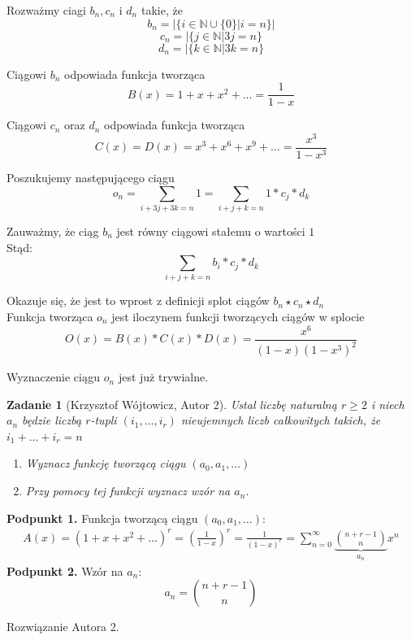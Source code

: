 \documentclass{mwart}
\newtheorem{zad}{Zadanie}[section]
\begin{document}
\begin{mdframed}
    Rozważmy ciagi $b_n,c_n$ i $d_n$ takie, że\\
    $$b_n = |\{i \in \mathbb{N} \cup \{0\}  | i = n\}|$$
    $$c_n = |\{j \in \mathbb{N} | 3j = n\}$$
    $$d_n = |\{k \in \mathbb{N} | 3k = n\}$$

    Ciągowi $b_n$ odpowiada funkcja tworząca\\
    $$ B(x) = 1 + x +x^2 + ... = \frac{1}{1-x}$$

    Ciągowi $c_n$ oraz $d_n$ odpowiada funkcja tworząca\\
    $$ C(x) = D(x) = x^3 + x^6 + x^9 + ... = \frac{x^3}{1-x^3}$$

    Poszukujemy następującego ciągu
    $$o_n = \sum_{i+3j+3k=n}1 = \sum_{i+j+k=n}1*c_j*d_k$$

    Zauważmy, że ciąg $b_n$ jest równy ciągowi stałemu o wartości $1$\\
    Stąd:
    $$ \sum_{i+j+k=n}b_i*c_j*d_k$$

    Okazuje się, że jest to wprost z definicji splot ciągów $b_n \star c_n \star d_n$\\

    Funkcja tworząca $o_n$ jest iloczynem funkcji tworzących ciągów w splocie\\

    $$O(x) = B(x)*C(x)*D(x) = \frac{x^6}{(1-x)(1-x^3)^2}$$

    Wyznaczenie ciągu $o_n$ jest już trywialne.

\end{mdframed}

\begin{zad}[Krzysztof Wójtowicz, Autor 2]
    Ustal liczbę naturalną $r \geqslant 2$ i niech $a_n$ będzie liczbą $r$-tupli $(i_1,\dots,i_r)$ nieujemnych liczb całkowitych takich, że $i_1 + \dots + i_r = n$
    \begin{enumerate}
        \item Wyznacz funkcję tworzącą ciągu $(a_0,a_1,\dots)$
        \item Przy pomocy tej funkcji wyznacz wzór na $a_n$.
    \end{enumerate}
\end{zad}
\begin{mdframed}
    \textbf{Podpunkt 1.} \newline
    Funkcja tworzącą ciągu $(a_0,a_1,\dots)$:
    \begin{gather*}
        A(x) = (1 + x + x^2 + \dots)^r = (\frac{1}{1-x})^r = \frac{1}{(1-x)^r} = \sum_{n=0}^{\infty} \underbrace{\binom{n+r-1}{n}}_{a_n} x^n
    \end{gather*}
    \textbf{Podpunkt 2.} \newline
    Wzór na $a_n$:
    \[ a_n = \binom{n+r-1}{n} \]
\end{mdframed}
\begin{mdframed}
    Rozwiązanie Autora 2.
\end{mdframed}
\end{document}
